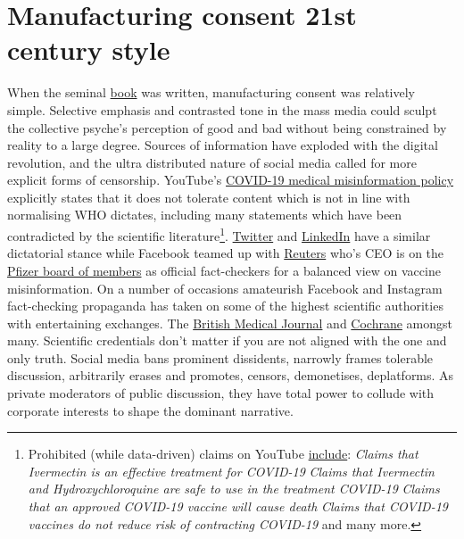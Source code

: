 \documentclass[11pt,a4paper,notitlepage]{report}
\begin{document}

\section*{Manufacturing consent 21st century style}

When the seminal \href{https://en.wikipedia.org/wiki/Manufacturing_Consent}{book} was written, manufacturing consent was  relatively simple. Selective emphasis and contrasted tone in the mass media could sculpt the collective psyche's perception of good and bad without being constrained by reality to a large degree. Sources of information have exploded with the digital revolution, and the ultra distributed nature of social media called for more explicit forms of censorship. YouTube's \href{https://support.google.com/youtube/answer/9891785}{COVID-19 medical misinformation policy} explicitly states that it does not tolerate content which is not in line with normalising WHO dictates, including many statements which have been contradicted by the scientific literature\footnote{Prohibited (while data-driven) claims on YouTube \href{https://support.google.com/youtube/answer/9891785}{include}: \textit{Claims that Ivermectin is an effective treatment for COVID-19} \cite{Kerr2022-ps} \cite{EFIMENKO2022S40} \textit{Claims that Ivermectin and Hydroxychloroquine are safe to use in the treatment COVID-19} \cite{wentzel2021} \textit{Claims that an approved COVID-19 vaccine will cause death} \cite{cdc14032022} \textit{Claims that COVID-19 vaccines do not reduce risk of contracting COVID-19} \cite{Hansen2021.12.20.21267966} and many more.}. \href{https://help.twitter.com/en/rules-and-policies/medical-misinformation-policy}{Twitter} and \href{https://news.linkedin.com/2020/march/promoting-trusted-information-on-covid-19}{LinkedIn} have a similar dictatorial stance while Facebook teamed up with \href{https://www.reuters.com/article/us-facebook-partnership-reuters-idUSKBN2062K4}{Reuters} \cite{reuters12022020} who's CEO is on the \href{https://www.pfizer.com/people/leadership/board_of_directors/james_smith}{Pfizer board of members} \cite{pfizer-james-smith} as official fact-checkers for a balanced view on vaccine misinformation. On a number of occasions amateurish Facebook and Instagram fact-checking propaganda has taken on some of the highest scientific authorities with entertaining exchanges. The \href{https://www.bmj.com/content/376/bmj.o95}{British Medical Journal} \cite{bmj19012022b} and \href{https://www.acsh.org/news/2021/11/14/covid-misinformation-blunder-instagram-censors-widely-respected-cochrane-collaboration-15937}{Cochrane} \cite{acsh14112021} amongst many. Scientific credentials don't matter if you are not aligned with the one and only truth. Social media bans prominent dissidents, narrowly frames tolerable discussion, arbitrarily erases and promotes, censors, demonetises, deplatforms. As private moderators of public discussion, they have total power to collude with corporate interests to shape the dominant narrative.
\end{document}
